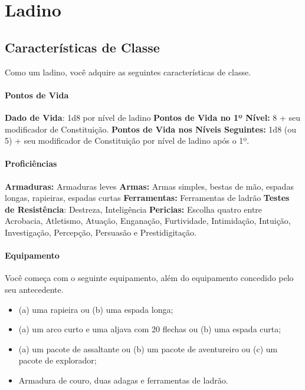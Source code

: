 \documentclass{RPG_Adventure}[2021/10/20]
\begin{document}
\chapter{Ladino}%
\label{cha:ladino}
\begin{multicols}{2}

\section*{Características de Classe}%

Como um ladino, você adquire as seguintes características de classe.

\subsubsection{Pontos de Vida}%

\noindent\textbf{Dado de Vida}: 1d8 por nível de ladino \nl
\textbf{Pontos de Vida no 1º Nível:} 8 + seu modificador de Constituição. \nl
\textbf{Pontos de Vida nos Níveis Seguintes:} 1d8 (ou 5) + seu modificador de
Constituição por nível de ladino após o 1º.

\subsubsection{Proficiências}%

\noindent\textbf{Armaduras:} Armaduras leves \nl
\textbf{Armas:} Armas simples, bestas de mão, espadas longas, rapieiras, espadas
curtas\nl
\textbf{Ferramentas:} Ferramentas de ladrão \jump
\textbf{Testes de Resistência}: Destreza, Inteligência \nl
\textbf{Pericias:} Escolha quatro entre Acrobacia, Atletismo, Atuação,
Enganação, Furtividade, Intimidação, Intuição, Investigação, Percepção,
Persuasão e Prestidigitação.

\subsubsection{Equipamento}%

Você começa com o seguinte equipamento, além do equipamento concedido pelo seu
antecedente.
\begin{itemize}
    \item (a) uma rapieira ou (b) uma espada longa;
    \item (a) um arco curto e uma aljava com 20 flechas ou (b) uma espada curta;
    \item (a) um pacote de assaltante ou (b) um pacote de aventureiro ou (c) um
        pacote de explorador;
    \item Armadura de couro, duas adagas e ferramentas de ladrão.
\end{itemize}


\end{multicols}
\end{document}
